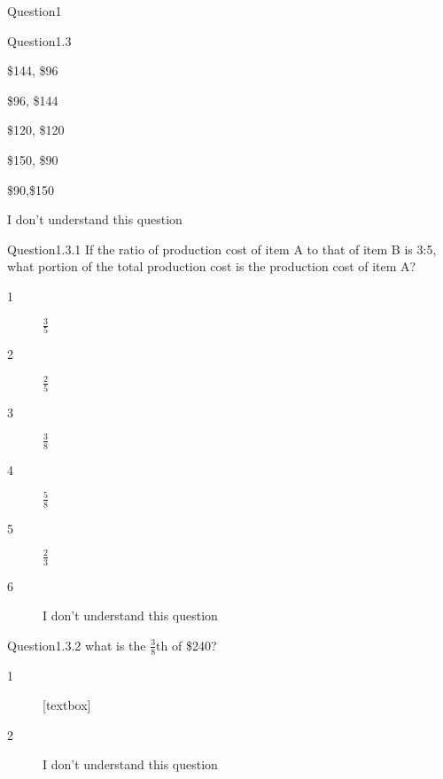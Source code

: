 \documentclass[titlepage]{article}
\begin{document}
\begin{section}{Question1}
\begin{subsection}{Question1.3}
\begin{description}
			\$144, \$96
		\item[2]
			\$96, \$144
		\item[3]
			\$120, \$120
		\item[4]
			\$150, \$90
		\item[5]
			\$90,\$150
		\item[6]
			I don't understand this question
		\end{description}
\begin{subsubsection}{Question1.3.1}
If the ratio of production cost of item A to that of item B is 3:5, what portion of the total production cost is the production cost of item A?
		\begin{description}
		\item[1]
			$\frac{3}{5}$
		\item[2]
			$\frac{2}{5}$
		\item[3]
			$\frac{3}{8}$
		\item[4]
			$\frac{5}{8}$
		\item[5]
			$\frac{2}{3}$
		\item[6]
			I don't understand this question
\end{description}
\end{subsubsection}
\begin{subsubsection}{Question1.3.2}
what is the $\frac{3}{8}$th of \$240?
		\begin{description}
		\item[1]
			[textbox]
		\item[2]
			I don't understand this question
		\end{description}		 
\end{subsubsection}
\end{subsection}
\end{section}
\end{document}
